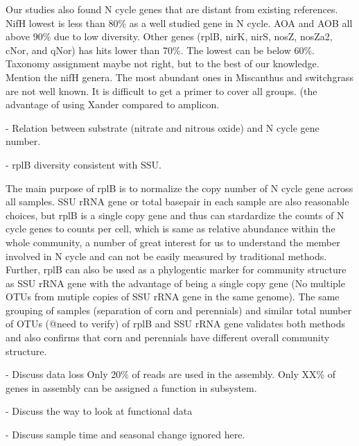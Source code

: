 \documentclass[12pt]{article}
\begin{document}
Our studies also found N cycle genes that are distant from existing references. NifH lowest is less than 80\% as a well studied gene in N cycle. AOA and AOB all above 90\% due to low diversity. Other genes (rplB, nirK, nirS, nosZ, nosZa2, cNor, and qNor) has hits lower than 70\%. The lowest can be below 60\%. Taxonomy assignment maybe not right, but to the best of our knowledge. Mention the nifH genera. The most abundant ones in Miscanthus and switchgrass are not well known. It is difficult to get a primer to cover all groups. (the advantage of using Xander compared to amplicon.

- Relation between substrate (nitrate and nitrous oxide) and N cycle gene number.

- rplB diversity consistent with SSU. 

The main purpose of rplB is to normalize the copy number of N cycle gene across all samples. SSU rRNA gene or total basepair in each sample are also reasonable choices, but rplB is a single copy gene and thus can stardardize the counts of N cycle genes to counts per cell, which is same as relative abundance within the whole community, a number of great interest for us to understand the member involved in N cycle and can not be easily measured by traditional methods. Further, rplB can also be used as a phylogentic marker for community structure as SSU rRNA gene with the advantage of being a single copy gene (No multiple OTUs from mutiple copies of SSU rRNA gene in the same genome). The same grouping of samples (separation of corn and perennials) and similar total number of OTUs (@need to verify) of rplB and SSU rRNA gene validates both methods and also confirms that corn and perennials have different overall community structure.

- Discuss data loss
Only 20\% of reads are used in the assembly. Only XX\% of genes in assembly can be assigned a function in subsystem.

- Discuss the way to look at functional data

- Discuss sample time and seasonal change ignored here.
\end{document}
